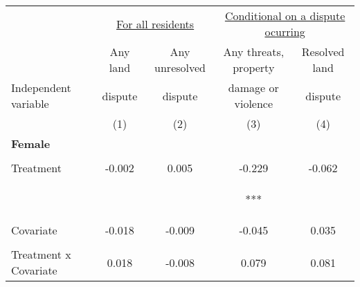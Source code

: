 \begin{tabular}{lcccc}
\hline \noalign{\smallskip} & \multicolumn{2}{c}{\uline{\hfill For all residents \hfill}} & \multicolumn{2}{c}{\uline{\hfill Conditional on a dispute ocurring \hfill}}\\
 & Any land & Any unresolved & Any threats, property & Resolved land\\
Independent variable & dispute & dispute & damage or violence & dispute\\
 & (1) & (2) & (3) & (4)\\
\noalign{\smallskip}\hline \noalign{\smallskip}\textbf{Female} &  &  &  & \\
 & \begin{footnotesize}\end{footnotesize} & \begin{footnotesize}\end{footnotesize} & \begin{footnotesize}\end{footnotesize} & \begin{footnotesize}\end{footnotesize}\\
\noalign{\smallskip}Treatment & -0.002 & 0.005 & -0.229 & -0.062\\
 & \begin{footnotesize}[0.015]\end{footnotesize} & \begin{footnotesize}[0.008]\end{footnotesize} & \begin{footnotesize}[0.066]***\end{footnotesize} & \begin{footnotesize}[0.067]\end{footnotesize}\\
\noalign{\smallskip}Covariate & -0.018 & -0.009 & -0.045 & 0.035\\
 & \begin{footnotesize}[0.012]\end{footnotesize} & \begin{footnotesize}[0.008]\end{footnotesize} & \begin{footnotesize}[0.071]\end{footnotesize} & \begin{footnotesize}[0.071]\end{footnotesize}\\
\noalign{\smallskip}Treatment x Covariate & 0.018 & -0.008 & 0.079 & 0.081\\

\end{tabular}
